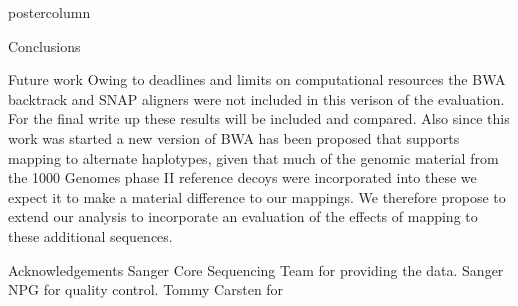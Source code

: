 \documentclass[final]{beamer}
\begin{document}
\begin{frame}{}
\begin{columns}
\begin{column}{.49\textwidth}
\begin{beamercolorbox}[center,wd=\textwidth]{postercolumn}
\begin{minipage}[T]{.95\textwidth}
\begin{block}{Conclusions}
            \end{block}
            \begin{block}{Future work}
                Owing to deadlines and limits on computational resources the BWA backtrack and SNAP aligners were not included in this verison of the evaluation. For the final write up these results will be included and compared.  Also since this work was started a new version of BWA has been proposed that supports mapping to alternate haplotypes, given that much of the genomic material from the 1000 Genomes phase II reference decoys were incorporated into these we expect it to make a material difference to our mappings. We therefore propose to extend our analysis to incorporate an evaluation of the effects of mapping to these additional sequences.
            \end{block}
            \begin{block}{Acknowledgements}
                Sanger Core Sequencing Team for providing the data. Sanger NPG for quality control. Tommy Carsten for 
            \end{block}
            \vfill


            \end{minipage}
        \end{beamercolorbox}
    \end{column}
    \end{columns}

\end{frame}
\end{document}

